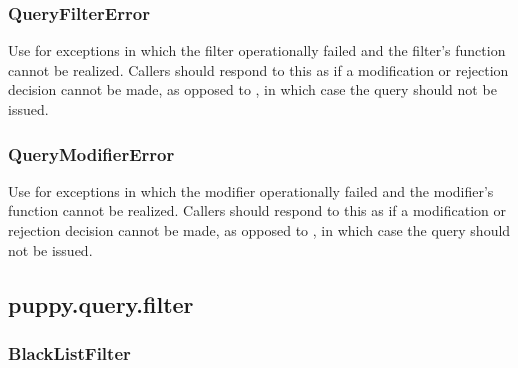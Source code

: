 \documentclass[letterpaper,10pt,english]{sphinxmanual}
\begin{document}
\subsubsection{QueryFilterError}
\label{api2.0:queryfiltererror}

\begin{fulllineitems}
\label{api2.0:puppy.query.exceptions.QueryFilterError}
Use for exceptions in which the filter operationally failed and the
filter's function cannot be realized. Callers should respond to this as if
a modification or rejection decision cannot be made, as opposed to
, in which case the query should
not be issued.

\end{fulllineitems}



\subsubsection{QueryModifierError}
\label{api2.0:querymodifiererror}

\begin{fulllineitems}
\label{api2.0:puppy.query.exceptions.QueryModifierError}
Use for exceptions in which the modifier operationally failed and the
modifier's function cannot be realized. Callers should respond to this as if
a modification or rejection decision cannot be made, as opposed to
, in which case the query should
not be issued.

\end{fulllineitems}



\subsection{puppy.query.filter}
\label{api2.0:module-puppy.query.filter}\label{api2.0:puppy-query-filter}

\subsubsection{BlackListFilter}
\label{api2.0:blacklistfilter}
\end{document}
